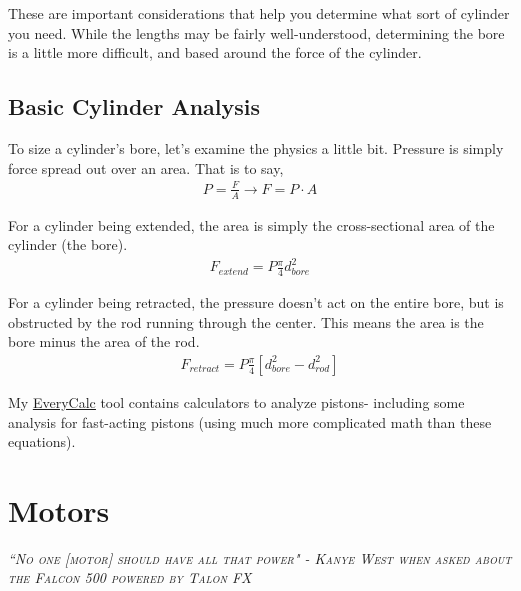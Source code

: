 These are important considerations that help you determine what sort of cylinder you need. While the lengths may be fairly well-understood, determining the bore is a little more difficult, and based around the force of the cylinder.

\section{Basic Cylinder Analysis}

To size a cylinder's bore, let's examine the physics a little bit. Pressure is simply force spread out over an area. That is to say,
\begin{align}
	P = \frac{F}{A} \rightarrow F = P \cdot A
\end{align}

For a cylinder being extended, the area is simply the cross-sectional area of the cylinder (the bore).
\begin{align}
	F_{extend} = P \frac{\pi}{4} d_{bore}^2
\end{align}

For a cylinder being retracted, the pressure doesn't act on the entire bore, but is obstructed by the rod running through the center. This means the area is the bore minus the area of the rod.
\begin{align}
	F_{retract} = P \frac{\pi}{4} [ d_{bore}^2 - d_{rod}^2 ]
\end{align}

My \href{http://thaddeus-maximus.github.io/swissarmyengineer/}{\color{red}\underline{EveryCalc}} tool contains calculators to analyze pistons- including some analysis for fast-acting pistons (using much more complicated math than these equations).


\chapter{Motors}

 {\slshape \scshape ``No one [motor] should have all that power" - Kanye West when asked about the Falcon 500 powered by Talon FX}
 \\ %
 

